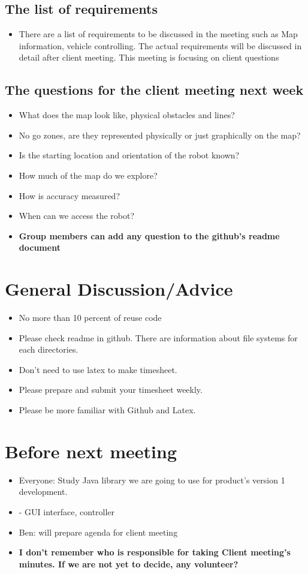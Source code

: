 \documentclass[11pt, a4paper]{article}
\begin{document}
\subsection{The list of requirements}
\begin{itemize}
\item There are a list of requirements to be discussed in the meeting such as Map information, vehicle controlling. The actual requirements will be discussed in detail after client meeting. This meeting is focusing on client questions
\end{itemize}

\subsection{The questions for the client meeting next week}
\begin{itemize}
\item What does the map look like, physical obstacles and lines?
\item No go zones, are they represented physically or just graphically on the map?
\item Is the starting location and orientation of the robot known?
\item How much of the map do we explore?
\item How is accuracy measured?
\item When can we access the robot?
\item \bf Group members can add any question to the github's readme document
\end{itemize}

\section{General Discussion/Advice}
\begin{itemize}
\item No more than 10 percent of reuse code
\item Please check readme in github. There are information about file systems for each directories.
\item Don't need to use latex to make timesheet. 
\item Please prepare and submit your timesheet weekly.
\item Please be more familiar with Github and Latex.
\end{itemize}

\section{Before next meeting}
\begin{itemize}
\item Everyone: Study Java library we are going to use for product's version 1 development.
\item - GUI interface, controller
\item Ben: will prepare agenda for client meeting
\item \bf I don't remember who is responsible for taking Client meeting's minutes. If we are not yet to decide, any volunteer?
\end{itemize}
\end{document}
